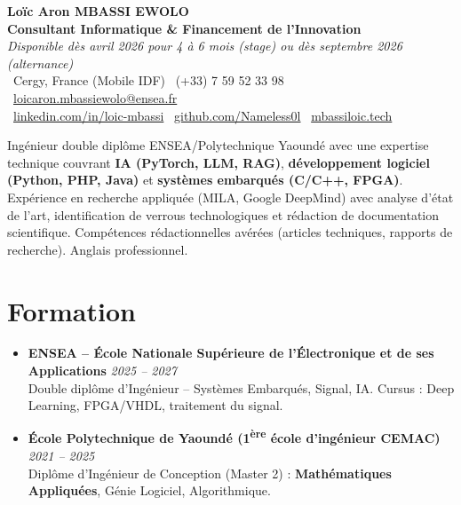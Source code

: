 \documentclass[a4paper,11pt]{article}
\begin{document}
\begin{center}
    {\Large \textbf{Loïc Aron MBASSI EWOLO}} \\ \vspace{4pt}
    \textbf{\large Consultant Informatique \& Financement de l'Innovation} \\
    \textit{\small Disponible dès avril 2026 pour 4 à 6 mois (stage) ou dès septembre 2026 (alternance)} \\ \vspace{4pt}
    \small
    \faMapMarker\ Cergy, France (Mobile IDF) \quad
    \faPhone\ (+33) 7 59 52 33 98 \quad
    \faEnvelope\ \href{mailto:loicaron.mbassiewolo@ensea.fr}{loicaron.mbassiewolo@ensea.fr} \\ \vspace{2pt}
    \faLinkedin\ \href{https://www.linkedin.com/in/loic-mbassi/}{linkedin.com/in/loic-mbassi} \quad
    \faGithub\ \href{https://github.com/Nameless0l}{github.com/Nameless0l} \quad
    \faGlobe\ \href{https://mbassiloic.tech}{mbassiloic.tech}
\end{center}

\vspace{-6pt}

\noindent\small{Ingénieur double diplôme ENSEA/Polytechnique Yaoundé avec une expertise technique couvrant \textbf{IA (PyTorch, LLM, RAG)}, \textbf{développement logiciel (Python, PHP, Java)} et \textbf{systèmes embarqués (C/C++, FPGA)}. Expérience en recherche appliquée (MILA, Google DeepMind) avec analyse d'état de l'art, identification de verrous technologiques et rédaction de documentation scientifique. Compétences rédactionnelles avérées (articles techniques, rapports de recherche). Anglais professionnel.}

\section{Formation}
\begin{itemize}[leftmargin=*, label=\tiny$\bullet$, nosep]
    \item \textbf{ENSEA -- École Nationale Supérieure de l'Électronique et de ses Applications} \hfill \textit{2025 -- 2027} \\
    \small{Double diplôme d'Ingénieur -- Systèmes Embarqués, Signal, IA. Cursus : Deep Learning, FPGA/VHDL, traitement du signal.}
    \item \textbf{École Polytechnique de Yaoundé (1\textsuperscript{ère} école d'ingénieur CEMAC)} \hfill \textit{2021 -- 2025} \\
    \small{Diplôme d'Ingénieur de Conception (Master 2) : \textbf{Mathématiques Appliquées}, Génie Logiciel, Algorithmique.}
\end{itemize}
\end{document}
